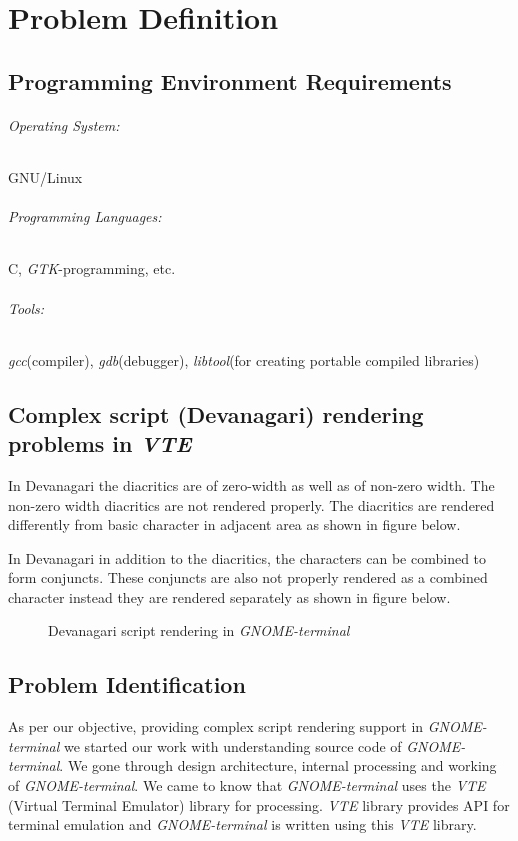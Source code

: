 %

\chapter{Problem Definition}

\section{Programming Environment Requirements}
\subparagraph{Operating System:}
GNU/Linux

\subparagraph{Programming Languages:}
C, \textit{GTK}-programming, etc.

\subparagraph{Tools:}
\textit{gcc}(compiler), \textit{gdb}(debugger), \textit{libtool}(for creating portable compiled libraries)

\section{Complex script (Devanagari) rendering problems in \textit{VTE}}

In Devanagari the diacritics are of zero-width as well as of non-zero width. The non-zero width diacritics are not rendered properly. The diacritics are rendered differently from basic character in adjacent area as shown in figure below.

In Devanagari in addition to the diacritics, the characters can be combined to form conjuncts. These conjuncts are also not properly rendered as a combined character instead they are rendered separately as shown in figure below. 

\begin{figure}[htbp]
\centerline{}
\caption{Devanagari script rendering in \textit{GNOME-terminal}} \label{Gnome Terminal6}
\end{figure}

\pagebreak
\section{Problem Identification}
As per our objective, providing complex script rendering support in \textit{GNOME-terminal} we started our work with understanding source code of \textit{GNOME-terminal}. We gone through design architecture, internal processing and working of \textit{GNOME-terminal}. We came to know that \textit{GNOME-terminal} uses the \textit{VTE} (Virtual Terminal Emulator) library for processing. \textit{VTE} library provides API for terminal emulation and \textit{GNOME-terminal} is written using this \textit{VTE} library.

